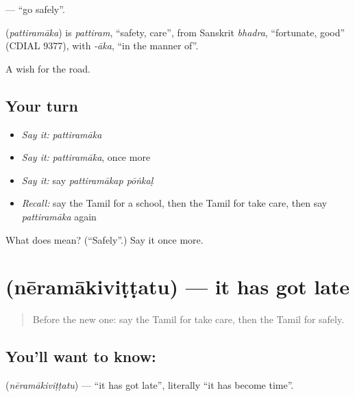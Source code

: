 \textbf{ } — \textquotedblleft{}go safely\textquotedblright{}.

\begin{cousinweb}
\textbf{} (\emph{pattiramāka}) is \emph{pattiram}, \textquotedblleft{}safety, care\textquotedblright{}, from Sanskrit \emph{bhadra}, \textquotedblleft{}fortunate, good\textquotedblright{} (CDIAL 9377), with \emph{-āka}, \textquotedblleft{}in the manner of\textquotedblright{}.
\end{cousinweb}

\begin{grammarlens}[title={What you've built}]
A wish for the road.
\end{grammarlens}

\subsection*{Your turn}
\begin{itemize}
\raggedright
  \item \emph{Say it:} \emph{pattiramāka}
  \item \emph{Say it:} \emph{pattiramāka}, once more
  \item \emph{Say it:} say \emph{pattiramākap pōṅkaḷ}
  \item \emph{Recall:} say the Tamil for a school, then the Tamil for take care, then say \emph{pattiramāka} again
\end{itemize}

\begin{tcolorbox}[breakable,colback=teal!4,colframe=teal!35!black,title={Before you move on}]
What does  mean? (\textquotedblleft{}Safely\textquotedblright{}.) Say it once more.
\end{tcolorbox}
\section[\texorpdfstring{\ta{நேரமாகிவிட்டது} (nēramākiviṭṭatu)}{நேரமாகிவிட்டது (nēramākiviṭṭatu)}]{ (nēramākiviṭṭatu) — it has got late}

\label{lesson:TA-C106-late}



\begin{quote}
Before the new one: say the Tamil for take care, then the Tamil for safely.
\end{quote}

\subsection*{You'll want to know: }
\textbf{} (\emph{nēramākiviṭṭatu}) — \textquotedblleft{}it has got late\textquotedblright{}, literally \textquotedblleft{}it has become time\textquotedblright{}.

